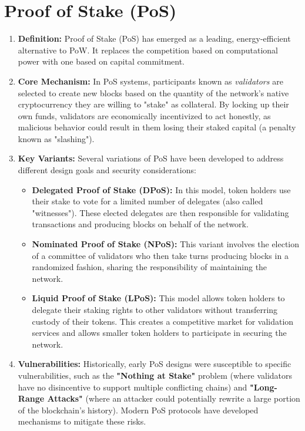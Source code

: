 \documentclass{scrbook}
\begin{document}
\section{Proof of Stake (PoS)}

\begin{enumerate}
    \item \textbf{Definition:} Proof of Stake (PoS) has emerged as a leading, energy-efficient alternative to PoW. It replaces the competition based on computational power with one based on capital commitment.
    \item \textbf{Core Mechanism:} In PoS systems, participants known as \textit{validators} are selected to create new blocks based on the quantity of the network's native cryptocurrency they are willing to "stake" as collateral. By locking up their own funds, validators are economically incentivized to act honestly, as malicious behavior could result in them losing their staked capital (a penalty known as "slashing").
    \item \textbf{Key Variants:} Several variations of PoS have been developed to address different design goals and security considerations:
    \begin{itemize}
        \item \textbf{Delegated Proof of Stake (DPoS):} In this model, token holders use their stake to vote for a limited number of delegates (also called "witnesses"). These elected delegates are then responsible for validating transactions and producing blocks on behalf of the network.
        \item \textbf{Nominated Proof of Stake (NPoS):} This variant involves the election of a committee of validators who then take turns producing blocks in a randomized fashion, sharing the responsibility of maintaining the network.
        \item \textbf{Liquid Proof of Stake (LPoS):} This model allows token holders to delegate their staking rights to other validators without transferring custody of their tokens. This creates a competitive market for validation services and allows smaller token holders to participate in securing the network.
    \end{itemize}
    \item \textbf{Vulnerabilities:} Historically, early PoS designs were susceptible to specific vulnerabilities, such as the \textbf{"Nothing at Stake"} problem (where validators have no disincentive to support multiple conflicting chains) and \textbf{"Long-Range Attacks"} (where an attacker could potentially rewrite a large portion of the blockchain's history). Modern PoS protocols have developed mechanisms to mitigate these risks.
\end{enumerate}
\end{document}
